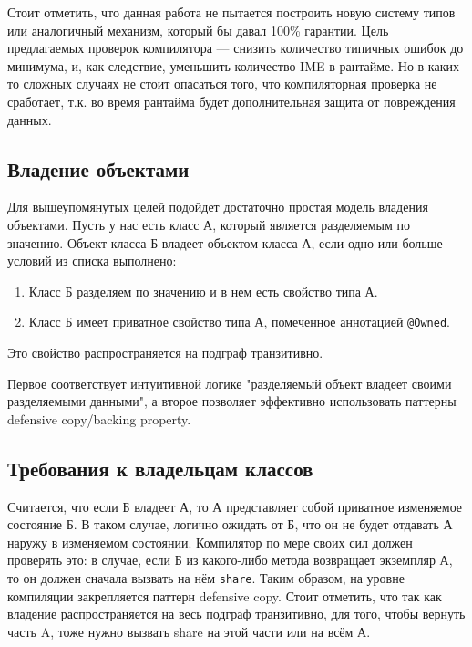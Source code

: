 \documentclass[specification,annotation,times]{itmo-student-thesis}
\begin{document}
Стоит отметить, что данная работа не пытается построить новую систему типов или аналогичный механизм, который бы давал 100\% гарантии.
Цель предлагаемых проверок компилятора --- снизить количество типичных ошибок до минимума, и, как следствие, уменьшить количество IME в рантайме.
Но в каких-то сложных случаях не стоит опасаться того, что компиляторная проверка не сработает,
т.к. во время рантайма будет дополнительная защита от повреждения данных.

\subsection{Владение объектами}

Для вышеупомянутых целей подойдет достаточно простая модель владения объектами. Пусть у нас есть класс А, который является разделяемым по значению.
Объект класса Б владеет объектом класса А, если одно или больше условий из списка выполнено:

\begin{enumerate}
	\item Класс Б разделяем по значению и в нем есть свойство типа А. %
	\item Класс Б имеет приватное свойство типа А, помеченное аннотацией \texttt{@Owned}.
\end{enumerate}

Это свойство распространяется на подграф транзитивно.

Первое соответствует интуитивной логике "разделяемый объект владеет своими разделяемыми данными", а второе позволяет эффективно использовать паттерны defensive copy/backing property.

\subsection{Требования к владельцам классов}

Считается, что если Б владеет А, то А представляет собой приватное изменяемое состояние Б.
В таком случае, логично ожидать от Б, что он не будет отдавать А наружу в изменяемом состоянии.
Компилятор по мере своих сил должен проверять это: в случае, если Б из какого-либо метода возвращает экземпляр А, то он должен сначала вызвать на нём \texttt{share}.
Таким образом, на уровне компиляции закрепляется паттерн defensive copy. Стоит отметить, что так как владение распространяется на весь подграф транзитивно, для того, чтобы вернуть часть A, тоже нужно вызвать share на этой части или на всём А.
\end{document}
